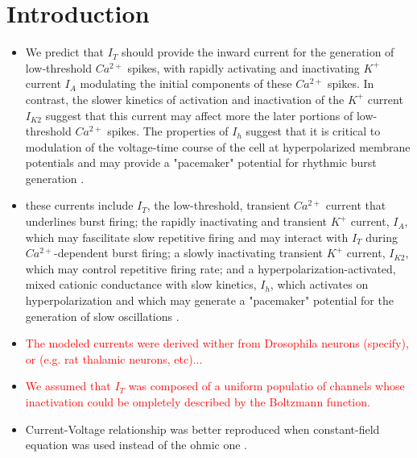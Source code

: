 \documentclass[./workflow.tex]{subfiles}
\begin{document}
    \section{Introduction}

    \begin{itemize}
        \item We predict that $I_T$ should provide the inward current for the generation of low-threshold
        $Ca^{2+}$ spikes, with rapidly activating and inactivating $K^+$ current $I_A$ modulating the
        initial components of these $Ca^{2+}$ spikes. In contrast, the slower kinetics of activation
        and inactivation of the $K^+$ current $I_{K2}$ suggest that this current may affect more the
        later portions of low-threshold $Ca^{2+}$ spikes. The properties of $I_h$ suggest that it is 
        critical to modulation of the voltage-time course of the cell at hyperpolarized membrane potentials and
        may provide a "pacemaker" potential for rhythmic burst generation
        \cite{huguenardSimulationCurrentsInvolved1992}.

        \item these currents include $I_T$, the low-threshold, transient $Ca^{2+}$ current that underlines
        burst firing; the rapidly inactivating and transient $K^{+}$ current, $I_A$, which may fascilitate
        slow repetitive firing and may interact with $I_T$ during $Ca^{2+}$-dependent burst firing;
        a slowly inactivating transient $K^+$ current, $I_{K2}$, which may control repetitive firing rate;
        and a hyperpolarization-activated, mixed cationic conductance with slow kinetics, $I_h$, which activates
        on hyperpolarization and which may generate a "pacemaker" potential for the generation of slow
        oscillations \cite{huguenardSimulationCurrentsInvolved1992}.

        \item \textcolor{red}{The modeled currents were derived wither from Drosophila neurons (specify),
        or (e.g. rat thalamic neurons, etc)...}

        \item \textcolor{red}{We assumed that $I_T$ was composed of a uniform populatio of channels
        whose inactivation could be ompletely described by the Boltzmann function.}

        \item Current-Voltage relationship was better reproduced when constant-field equation was
        used instead of the ohmic one \cite{huguenardSimulationCurrentsInvolved1992}.


\end{itemize}
\end{document}
